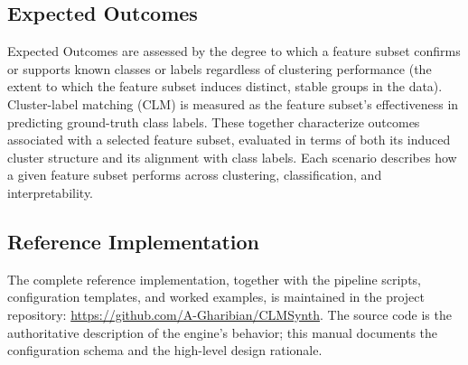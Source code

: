 \documentclass[a4paper,12pt]{article}
\begin{document}
\subsection{Expected Outcomes}
Expected Outcomes are assessed by the degree to which a feature subset confirms or supports known classes or labels regardless of clustering performance (the extent to which the feature subset induces distinct, stable groups in the data). Cluster-label matching (CLM) is measured as the feature subset's effectiveness in predicting ground-truth class labels. These together characterize outcomes associated with a selected feature subset, evaluated in terms of both its induced cluster structure and its alignment with class labels. Each scenario describes how a given feature subset performs across clustering, classification, and interpretability.

\subsection{Reference Implementation}
The complete reference implementation, together with the pipeline scripts, configuration templates, and worked examples, is maintained in the project repository: \url{https://github.com/A-Gharibian/CLMSynth}. The source code is the authoritative description of the engine's behavior; this manual documents the configuration schema and the high-level design rationale. 
\newpage
\end{document}
